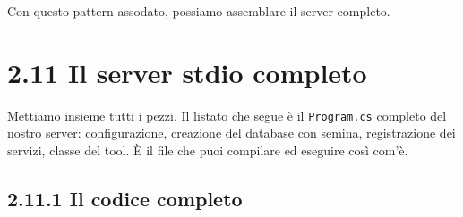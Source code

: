 \documentclass[
  italian,
  10pt,
]{book}
\begin{document}
Con questo pattern assodato, possiamo assemblare il server completo.

\section{2.11 Il server stdio completo}\label{il-server-stdio-completo}

Mettiamo insieme tutti i pezzi. Il listato che segue è il
\texttt{Program.cs} completo del nostro server: configurazione,
creazione del database con semina, registrazione dei servizi, classe del
tool. È il file che puoi compilare ed eseguire così com'è.

\subsection{2.11.1 Il codice completo}\label{il-codice-completo-4}
\end{document}
